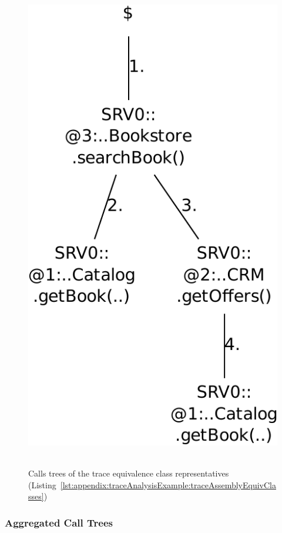 \begin{figure}[h]
{\ \ \includegraphics[scale=0.4]{../../examples/userguide/ch5--trace-monitoring-aspectj/testdata/kieker-20100830-082225522-UTC-example-plots/callTree-6488138950668976141-crop}\ \ 
}
\caption{Calls trees of the trace %
equivalence class representatives (Listing~\ref{lst:appendix:traceAnalysisExample:traceAssemblyEquivClasses})}
\label{fig:appendix:traceAnalysisExample:TraceCallTrees}
\end{figure}


\subsubsection{Aggregated Call Trees}\label{sec:example:aggregatedCallTrees}%

